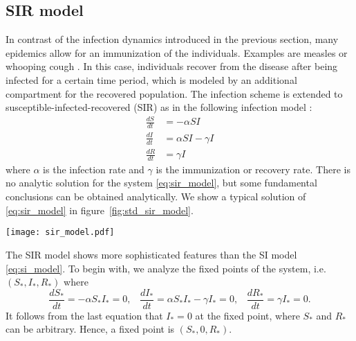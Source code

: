 \subsection{SIR model}\label{sec:sir_model}
In contrast of the infection dynamics introduced in the previous section, many epidemics allow for an immunization of the individuals.
Examples are measles or whooping cough \citep{grenfell:92} \citep{andersonmay:92}.
In this case, individuals recover from the disease after being infected for a certain time period, which is modeled by an additional compartment for the recovered population.
The infection scheme is extended to susceptible-infected-recovered (SIR) as in the following infection model \citep{kermack:27}:
\begin{align}\label{eq:sir_model}
\frac{dS}{dt} &= -\alpha SI \nonumber \\
\frac{dI}{dt} &= \alpha SI -\gamma I \nonumber \\
\frac{dR}{dt} &= \gamma I
\end{align}
where $\alpha $ is the infection rate and $\gamma $ is the immunization or recovery rate.
There is no analytic solution for the system \eqref{eq:sir_model}, but some fundamental conclusions can be obtained analytically.
We show a typical solution of \eqref{eq:sir_model} in figure~\ref{fig:std_sir_model}.
%
\begin{SCfigure}%
\texttt{[image: sir\_model.pdf]}
\caption{Solution of the susceptible-infected-recovered (SIR) model \eqref{eq:sir_model}.
The number of infected shows that the spreading process is a single event.
Note that a fraction of the population is still susceptible at the end of the process.
Parameters: $\alpha = 3$, $\gamma = 1$, $N=300$, $S_0=1$.}
\label{fig:std_sir_model}
\end{SCfigure}
%


The SIR model shows more sophisticated features than the SI model \eqref{eq:si_model}.
To begin with, we analyze the fixed points of the system, i.e. $(S_*,I_*,R_*)$ where
\begin{equation}
\frac{dS_*}{dt} = -\alpha S_*I_* =0 ,\; \;\;
\frac{dI_*}{dt} = \alpha S_*I_* -\gamma I_* =0,\; \;\;
\frac{dR_*}{dt} = \gamma I_* = 0.
\end{equation}
It follows from the last equation that $I_*=0$ at the fixed point, where $S_*$ and $R_*$ can be arbitrary.
Hence, a fixed point is $(S_*,0,R_*)$.

